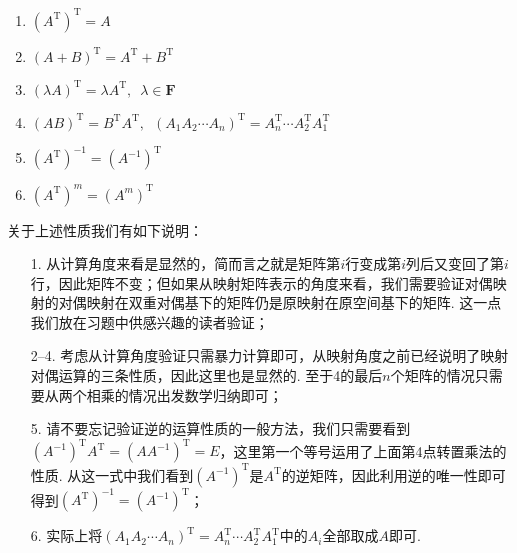 \begin{enumerate}
    \item $(A^\mathrm{T})^\mathrm{T}=A$

    \item $(A+B)^\mathrm{T}=A^\mathrm{T}+B^\mathrm{T}$

    \item $(\lambda A)^\mathrm{T}=\lambda A^\mathrm{T},\enspace \lambda \in \mathbf{F}$

    \item $(AB)^\mathrm{T}=B^\mathrm{T}A^\mathrm{T},\enspace(A_1A_2\cdots A_n)^\mathrm{T}=A_n^\mathrm{T}\cdots A_2^\mathrm{T}A_1^\mathrm{T}$

    \item $(A^\mathrm{T})^{-1}=(A^{-1})^\mathrm{T}$

    \item $(A^\mathrm{T})^m=(A^m)^\mathrm{T}$
\end{enumerate}
关于上述性质我们有如下说明：
\begin{itemize}
    \item[1.] 从计算角度来看是显然的，简而言之就是矩阵第$i$行变成第$i$列后又变回了第$i$行，因此矩阵不变；但如果从映射矩阵表示的角度来看，我们需要验证对偶映射的对偶映射在双重对偶基下的矩阵仍是原映射在原空间基下的矩阵. 这一点我们放在习题中供感兴趣的读者验证；

    \item[2--4.] 考虑从计算角度验证只需暴力计算即可，从映射角度之前已经说明了映射对偶运算的三条性质，因此这里也是显然的. 至于4的最后$n$个矩阵的情况只需要从两个相乘的情况出发数学归纳即可；

    \item[5.] 请不要忘记验证逆的运算性质的一般方法，我们只需要看到$(A^{-1})^\mathrm{T}A^\mathrm{T}=(AA^{-1})^\mathrm{T}=E$，这里第一个等号运用了上面第4点转置乘法的性质. 从这一式中我们看到$(A^{-1})^\mathrm{T}$是$A^\mathrm{T}$的逆矩阵，因此利用逆的唯一性即可得到$(A^\mathrm{T})^{-1}=(A^{-1})^\mathrm{T}$；

    \item[6.] 实际上将$(A_1A_2\cdots A_n)^\mathrm{T}=A_n^\mathrm{T}\cdots A_2^\mathrm{T}A_1^\mathrm{T}$中的$A_i$全部取成$A$即可.
\end{itemize}

